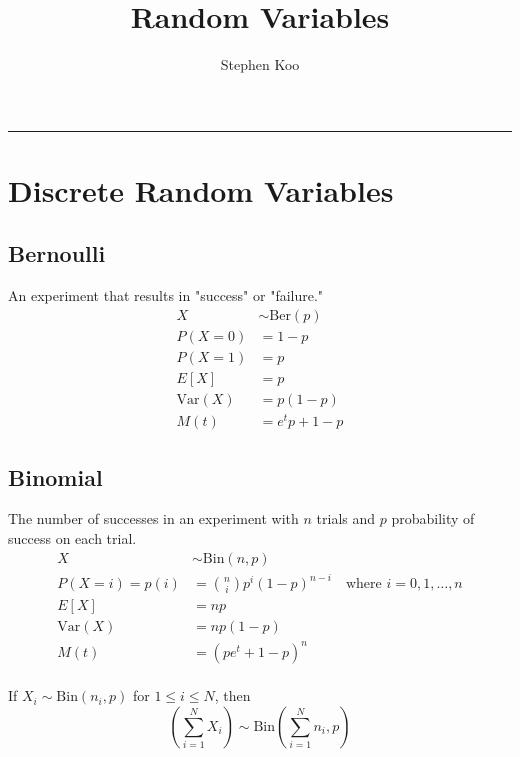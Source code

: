 \documentclass[12pt]{article}
\title{Random Variables}
\author{Stephen Koo}
\newcommand{\Sp}{\text{ }}
\newcommand{\Var}{\text{Var}}
\newcommand{\Bin}{\text{Bin}}
\newcommand{\Where}{\Sp\text{ where }}
\begin{document}
\maketitle
\vspace{-0.3in}
\rule{\linewidth}{0.4pt}

\section{Discrete Random Variables}
\subsection{Bernoulli}
An experiment that results in "success" or "failure."
\begin{align*}
    X& \sim \text{Ber}(p) \\
    P(X = 0)& = 1 - p \\
    P(X = 1)& = p \\
        E[X]& = p \\
     \Var(X)& = p(1-p) \\
        M(t)& = e^t p + 1 - p
\end{align*}

\subsection{Binomial}
The number of successes in an experiment with $n$ trials and $p$ probability of success on each trial.
\begin{align*}
    X& \sim \Bin(n,p) \\
    P(X = i) = p(i)& = \binom{n}{i} p^i (1-p)^{n-i} \Where i = 0,1,\ldots, n\\
               E[X]& = np \\
            \Var(X)& = np(1-p) \\
               M(t)& = (pe^t + 1 - p)^n
\end{align*}
\\
If $X_i \sim \Bin(n_i, p)$ for $1 \leq i \leq N$, then
\[
    \left( \sum_{i=1}^N X_i \right) \sim \Bin\left(\sum_{i=1}^N n_i, p \right)
\]
\end{document}

